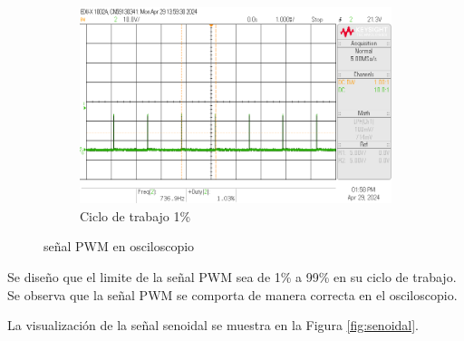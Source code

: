 \documentclass{article}
\begin{document}
\begin{figure}[H]
\begin{subfigure}{.3\textwidth}
        \centering
        \includegraphics[width=\linewidth]{images/scope_3.png}
        \caption{Ciclo de trabajo 1\%}
        \label{fig:pwm_3}
    \end{subfigure}
    \caption{señal PWM en osciloscopio}
    \label{fig:osciloscopio}
\end{figure}
Se diseño que el limite de la señal PWM sea de 1\% a 99\% en su ciclo de trabajo. Se observa que la señal PWM se comporta de manera correcta en el osciloscopio.

La visualización de la señal senoidal se muestra en la Figura \ref{fig:senoidal}.
\end{document}
